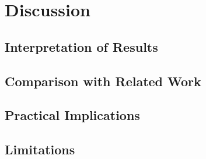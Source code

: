 \chapter{Discussion}\label{chap:discussion}

\section{Interpretation of Results}\label{sec:discussion-interp}

\section{Comparison with Related Work}\label{sec:discussion-rw}

\section{Practical Implications}\label{sec:discussion-implications}

\section{Limitations}\label{sec:discussion-limitations}
